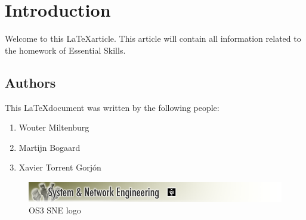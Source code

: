 \chapter{Introduction}
\label{chap:introduction}
Welcome to this \LaTeX article. This article will contain all information related to the homework of Essential Skills.

\section{Authors}
This \LaTeX document was written by the following people:
\begin{enumerate}
\item Wouter Miltenburg
\item Martijn Bogaard
\item Xavier Torrent Gorj\'on
\end{enumerate}


\begin{figure}[ht]
\includegraphics[width=15cm]{Chapters/00_intro_sne_logo.png}
\caption{OS3 SNE logo\footnotemark}
\end{figure}

